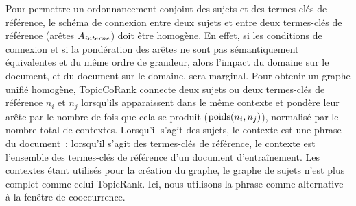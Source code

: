         Pour permettre un ordonnancement conjoint des sujets et des termes-clés
        de référence, le schéma de connexion entre deux sujets et entre deux
        termes-clés de référence (arêtes $A_\textnormal{\textit{interne}}$) doit
        être homogène. En effet, si les conditions de connexion et si la
        pondération des arêtes ne sont pas sémantiquement équivalentes et du
        même ordre de grandeur, alors l'impact du domaine sur
        le document, et du document sur le domaine, sera marginal. Pour
        obtenir un graphe unifié homogène, TopicCoRank connecte deux sujets ou
        deux termes-clés de référence $n_i$ et $n_j$ lorsqu'ils apparaissent
        dans le même contexte et pondère leur arête par le nombre de fois que
        cela se produit ($\textnormal{poids}(n_i, n_j)$), normalisé par le
        nombre total de contextes. Lorsqu'il s'agit des sujets, le contexte est
        une phrase du document~; lorsqu'il s'agit des
        termes-clés de référence, le contexte est l'ensemble des termes-clés de
        référence d'un document d'entraînement. Les contextes
        étant utilisés pour la création du graphe, le graphe de sujets n'est
        plus complet comme celui TopicRank. Ici, nous utilisons la phrase comme
        alternative à la fenêtre de cooccurrence.

